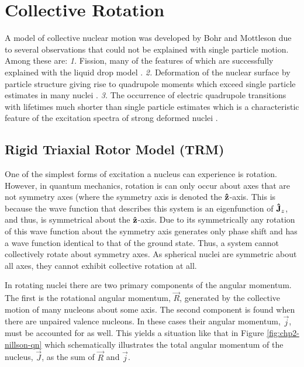 \section{Collective Rotation}
\label{sec:models-rigid-rotor}
A model of collective nuclear motion was developed by Bohr and Mottleson \cite{bohrMottelson2,bohrMottelsonArticle} due to several observations that could not be explained with single particle motion. Among these are: \emph{1.} Fission, many of the features of which are successfully explained with the liquid drop model \cite{meitnerFissionProducts,fissionMechanism}. \emph{2.} Deformation of the nuclear surface by particle structure \cite{deformationPrediction} giving rise to quadrupole moments which exceed single particle estimates in many nuclei \cite{casimirQuadMoments,nuclearQuadMomentsAndShellStruc}. \emph{3.} The occurrence of electric quadrupole \gr{} transitions with lifetimes much shorter than single particle estimates \cite{nuclearIsomerClassification} which is a characteristic feature of the excitation spectra of strong deformed nuclei \cite{QuadIsomerInterp}.
\subsection{Rigid Triaxial Rotor Model (TRM)}
\label{ssec:models-triaxial-rotor}
One of the simplest forms of excitation a nucleus can experience is rotation. However, in quantum mechanics, rotation is can only occur about axes that are not symmetry axes (where the symmetry axis is denoted the $\boldsymbol{\hat{\textbf{z}}}$-axis. This is because the wave function that describes this system is an eigenfunction of $\boldsymbol{\hat{\textbf{J}}}_z$, and thus, is symmetrical about the $\boldsymbol{\hat{\textbf{z}}}$-axis. Due to its symmetrically any rotation of this wave function about the symmetry axis generates only phase shift and has a wave function identical to that of the ground state. Thus, a system cannot collectively rotate about symmetry axes. As spherical nuclei are symmetric about all axes, they cannot exhibit collective rotation at all.

In rotating nuclei there are two primary components of the angular momentum. The first is the rotational angular momentum, $\vec{R}$, generated by the collective motion of many nucleons about some axis. The second component is found when there are unpaired valence nucleons. In these cases their angular momentum, $\vec{j}$, must be accounted for as well. This yields a situation like that in Figure \ref{fig:chp2-nillson-qn} which schematically illustrates the total angular momentum of the nucleus, $\vec{J}$, as the sum of $\vec{R}$ and $\vec{j}$.

